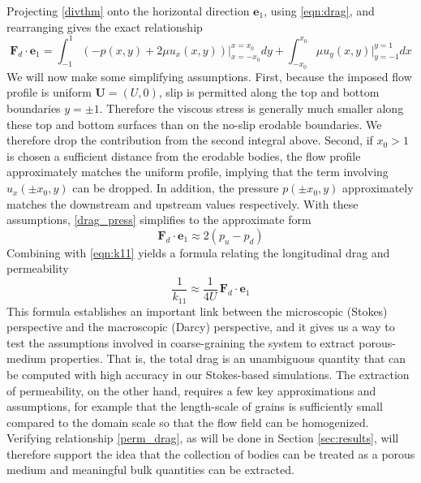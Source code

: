 \documentclass[3p]{elsarticle}
\newcommand{\UU}{{\mathbf{U}}}
\newcommand{\bvec}[1]{\mathbf{#1}}
\newcommand{\pup}{p_u}
\newcommand{\pdn}{p_d}
\newcommand{\FD}{\bvec{F}_d}
\newcommand{\ex}{ {\bvec{e}}_1}
\begin{document}
Projecting \eqref{divthm} onto the horizontal direction $\ex$, using \eqref{eqn:drag}, and rearranging gives the exact relationship
\begin{equation}
\label{drag_press}
\FD \cdot \ex = \int_{-1}^{1} \left( -p(x,y) + 2 \mu u_x(x,y) \right) \big|_{x=-x_0}^{x=x_0} dy + 
\int_{-x_0}^{x_0} \mu u_y(x,y) \big|_{y=-1}^{y=1} dx
\end{equation}
We will now make some simplifying assumptions. First, because the imposed flow profile is uniform $\UU = (U,0)$, slip is permitted along the top and bottom boundaries $y=\pm 1$. Therefore the viscous stress is generally much smaller along these top and bottom surfaces than on the no-slip erodable boundaries. We therefore drop the contribution from the second integral above. Second, if $x_0 > 1$ is chosen a sufficient distance from the erodable bodies, the flow profile approximately matches the uniform profile, implying that the term involving $u_x(\pm x_0, y)$ can be dropped. In addition, the pressure $p(\pm x_0, y)$ approximately matches the downstream and upstream values respectively. With these assumptions, \eqref{drag_press} simplifies to the approximate form
\begin{equation}
\FD \cdot \ex \approx 2 (\pup - \pdn)
\end{equation}
Combining with \eqref{eqn:k11} yields a formula relating the longitudinal drag and permeability
\begin{equation}
\label{perm_drag}
\frac{1}{k_{11}} \approx \frac{1}{4 U}  \, \FD \cdot \ex
\end{equation}
This formula establishes an important link between the microscopic (Stokes) perspective and the macroscopic (Darcy) perspective, and it gives us a way to test the assumptions involved in coarse-graining the system to extract porous-medium properties. That is, the total drag is an unambiguous quantity that can be computed with high accuracy in our Stokes-based simulations. The extraction of permeability, on the other hand, requires a few key approximations and assumptions, for example that the length-scale of grains is sufficiently small compared to the domain scale so that the flow field can be homogenized. Verifying relationship \eqref{perm_drag}, as will be done in Section \ref{sec:results}, will therefore support the idea that the collection of bodies can be treated as a porous medium and meaningful bulk quantities can be extracted.

\end{document}
